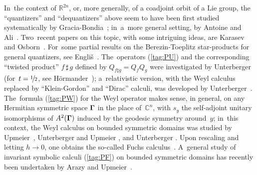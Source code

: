 \documentclass[12pt]{amsart}
\numberwithin{equation}{section}
\theoremstyle{remark}
\newcommand\Omg{{\bigam}}   %
\newcommand\mfr[2]{\raise 0.2\baselineskip\hbox{$\scriptstyle #1$}\!/\hskip
                 -0.1\baselineskip{\scriptstyle #2}}
\newcommand\RR{\mathbb R}
\newcommand{\CC}{\C}
\newcommand{\bigam}{\mbox{\boldmath $\Gamma$}}
\newcommand{\C}{\mathbb C}
\begin{document}
In~the context of $\RR^{2n}$, or, more generally, of a coadjoint orbit of a Lie
group, the ``quantizers'' and ``dequantizers'' above seem to have been first
studied systematically by Gracia-Bondia~\cite{bib:GraBo}; in~a~more general
setting, by Antoine and Ali~\cite{bib:AAli}. Two~recent papers on this topic,
with some intriguing ideas, are Karasev and Osborn~\cite{bib:+KaOsb}. For~some
partial results on the Berezin-Toeplitz star-products for general quantizers,
see Engli\v s~\cite{bib:+Elmp}. The~operators (\ref{tag:PU}) and the
corresponding ``twisted product'' $f\,\sharp\,g$ defined by $Q_{f\sharp g}=
Q_f Q_g$ were investigated by
Unterberger~\cite{bib:Unta} (for~$t=\mfr12$, see H\"ormander~\cite{bib:HormW});
a~relativistic version, with the Weyl calculus replaced by ``Klein-Gordon'' and
``Dirac'' calculi, was developed by Unterberger~\cite{bib:Untr}. The~formula
(\ref{tag:PW}) for the Weyl operator makes sense, in general, on any Hermitian
symmetric space $\Omg$ in the place of~$\CC^n$, with $s_y$ the self-adjoint
unitary isomorphisms of $A^2(\Omg)$ induced by the geodesic symmetry
around~$y$; in~this context, the Weyl calculus on bounded symmetric domains was
studied by Upmeier~\cite{bib:UpmW}, Unterberger and Upmeier \cite{bib:UntU},
and Unterberger \cite{bib:Untw} \cite{bib:UntESI}. Upon rescaling and letting
$h\to0$, one obtains the so-called Fuchs calculus~\cite{bib:UntF}. A~general
study of invariant symbolic calculi (\ref{tag:PF}) on bounded symmetric domains
has recently been undertaken by Arazy and Upmeier~\cite{bib:ArUp}.
\end{document}
